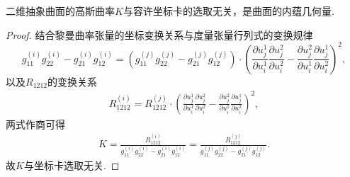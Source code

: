 \documentclass[../../main.tex]{subfiles}%
\begin{document}
\begin{theorem}
二维抽象曲面的高斯曲率$K$与容许坐标卡的选取无关，是曲面的内蕴几何量.
\end{theorem}

\begin{proof}

结合黎曼曲率张量的坐标变换关系与度量张量行列式的变换规律
$$g_{11}^{(i)}g_{22}^{(i)}-g_{21}^{(i)}g_{12}^{(i)}=\left(g_{11}^{(j)}g_{22}^{(j)}-g_{21}^{(j)}g_{12}^{(j)}\right)\cdot\left(\frac{\partial u_j^1}{\partial u_i^1}\frac{\partial u_j^2}{\partial u_i^2}-\frac{\partial u_j^2}{\partial u_i^1}\frac{\partial u_j^1}{\partial u_i^2}\right)^2,$$
以及$R_{1212}$的变换关系
\begin{align}
R_{1212}^{(i)}=R_{1212}^{(j)}\cdot\left(\frac{\partial u_j^1}{\partial u_i^1}\frac{\partial u_j^2}{\partial u_i^2}-\frac{\partial u_j^2}{\partial u_i^1}\frac{\partial u_j^1}{\partial u_i^2}\right)^2,
\label{eq:mo23423efSGE9}
\end{align}
两式作商可得
\begin{align}
K=\frac{R_{1212}^{(i)}}{g_{11}^{(i)}g_{22}^{(i)}-g_{21}^{(i)}g_{12}^{(i)}}=\frac{R_{1212}^{(j)}}{g_{11}^{(j)}g_{22}^{(j)}-g_{21}^{(j)}g_{12}^{(j)}}.
\label{eq:mo23423efSGE10}
\end{align}
故$K$与坐标卡选取无关.

\end{proof}
\end{document}
